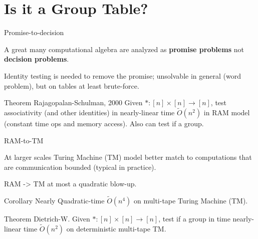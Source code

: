 \documentclass{beamer}
\begin{document}
\section{Is it a Group Table?}

\begin{frame}{Promise-to-decision}

A great many computational algebra are analyzed as \textbf{promise problems}
not \textbf{decision problems}.

Identity testing is needed to remove the promise; unsolvable in general (word problem), 
but on tables at least brute-force.
\pause

\begin{block}{Theorem Rajagopalan-Schulman, 2000}
    Given $*:[n]\times [n]\to [n]$, test associativity (and other identities) in
    nearly-linear time $\tilde{O}(n^2)$ in RAM model (constant time ops and
    memory access). Also can test if a group.
\end{block}

\end{frame}

\begin{frame}{RAM-to-TM}

At larger scales Turing Machine (TM) model better match to computations 
that are communication bounded (typical in practice).

RAM -> TM at most a quadratic blow-up.
\begin{block}{Corollary}
Nearly Quadratic-time $\tilde{O}(n^4)$ on multi-tape Turing Machine (TM).
\end{block}

\pause
\begin{block}{Theorem Dietrich-W.}
    Given $*:[n]\times [n]\to [n]$,
    test if a group in time nearly-linear time
    $\tilde{O}(n^2)$ on deterministic multi-tape TM.
\end{block}

\end{frame}
\end{document}
